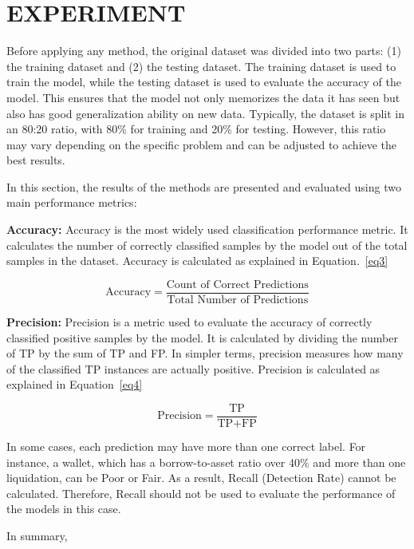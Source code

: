 \documentclass[../ICIT-Paper-2024.tex]{subfiles}
\begin{document}
\section{EXPERIMENT}\label{section4}
Before applying any method, the original dataset was divided into two parts: (1) the training dataset and (2) the testing dataset. The training dataset is used to train the model, while the testing dataset is used to evaluate the accuracy of the model. This ensures that the model not only memorizes the data it has seen but also has good generalization ability on new data. Typically, the dataset is split in an 80:20 ratio, with 80\% for training and 20\% for testing. However, this ratio may vary depending on the specific problem and can be adjusted to achieve the best results.

In this section, the results of the methods are presented and evaluated using two main performance metrics:

\textbf{Accuracy:} Accuracy is the most widely used classification performance metric. It calculates the number of correctly classified samples by the model out of the total samples in the dataset. Accuracy is calculated as explained in Equation.~\ref{eq3}

\begin{equation}\label{eq3}
    \text{Accuracy} = \frac{\text{Count of Correct Predictions}}{\text{Total Number of Predictions}}
\end{equation}

\textbf{Precision:} Precision is a metric used to evaluate the accuracy of correctly classified positive samples by the model. It is calculated by dividing the number of TP by the sum of TP and FP. In simpler terms, precision measures how many of the classified TP instances are actually positive. Precision is calculated as explained in Equation~\ref{eq4}

\begin{equation}\label{eq4}
    \text{Precision} = \frac{\text{TP}}{\text{TP} + \text{FP}}
\end{equation}

In some cases, each prediction may have more than one correct label. For instance, a wallet, which has a borrow-to-asset ratio over 40\% and more than one liquidation, can be Poor or Fair. As a result, Recall (Detection Rate) cannot be calculated. Therefore, Recall should not be used to evaluate the performance of the models in this case.



In summary, 
\end{document}
